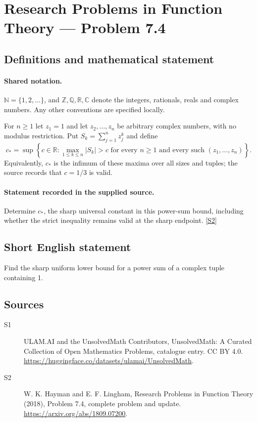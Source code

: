 \documentclass[11pt]{article}
\newcommand{\sref}[2]{\hyperlink{source:#1:#2}{[S#2]}}
\begin{document}
\section{Research Problems in Function Theory — Problem 7.4}\label{statement}

\subsection{Definitions and mathematical statement}

\paragraph{Shared notation.}$\mathbb N=\{1,2,\ldots\}$, and $\mathbb Z,\mathbb Q,\mathbb R,\mathbb C$ denote the integers, rationals, reals and complex numbers. Any other conventions are specified locally.


For $n\geq1$ let $z_1=1$ and let $z_2,\ldots,z_n$ be arbitrary complex numbers, with no modulus restriction. Put $S_k=\sum_{j=1}^{n}z_j^k$ and define
\[c_*=\sup\left\{c\in\mathbb R:\max_{1\leq k\leq n}|S_k|>c
\text{ for every }n\geq1\text{ and every such }(z_1,\ldots,z_n)\right\}.\]
Equivalently, $c_*$ is the infimum of these maxima over all sizes and tuples; the source records that $c=1/3$ is valid.
\paragraph{Statement recorded in the supplied source.}
Determine $c_*$, the sharp universal constant in this power-sum bound, including whether the strict inequality remains valid at the sharp endpoint. \sref{statement}{2}
\subsection{Short English statement}
Find the sharp uniform lower bound for a power sum of a complex tuple containing 1.
\subsection{Sources}
\begin{description}
\item[\hypertarget{source:statement:1}{S1}] ULAM.AI and the UnsolvedMath Contributors, UnsolvedMath: A Curated Collection of Open Mathematics Problems, catalogue entry. CC BY 4.0. \url{https://huggingface.co/datasets/ulamai/UnsolvedMath}.
\item[\hypertarget{source:statement:2}{S2}] W. K. Hayman and E. F. Lingham, Research Problems in Function Theory (2018), Problem 7.4, complete problem and update. \url{https://arxiv.org/abs/1809.07200}.
\end{description}
\label{end:statement}
\end{document}
